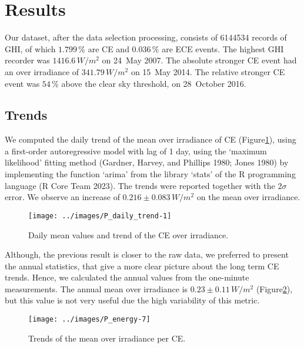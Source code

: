 \documentclass[
]{article}
\begin{document}
\FloatBarrier

\hypertarget{results}{%
\section{Results}\label{results}}

Our dataset, after the data selection processing, consists of
6144534 records of GHI, of which
\(1.799\,\%\) are CE and
\(0.036\,\%\) are ECE events.
The highest GHI recorder was
\(1416.6\,W/m^2\)
on 24~May 2007.
The absolute stronger CE event had an over irradiance of
\(341.79\,W/m^2\) on
15~May 2014.
The relative stronger CE event was
\(54\,\%\) above the
clear sky threshold, on
28~October 2016.

\hypertarget{trends}{%
\subsection{Trends}\label{trends}}

We computed the daily trend of the mean over irradiance of CE
(Figure\nobreakspace{}\ref{fig:CEmeanDaily}), using a first-order autoregressive
model with lag of 1 day, using the `maximum likelihood' fitting method (Gardner, Harvey, and Phillips 1980; Jones 1980) by implementing the function `arima' from the library `stats' of the R
programming language (R Core Team 2023). The trends were reported together with the \(2\sigma\)
error. We observe an increase of
\(0.216\pm 0.083\,W/m^2\)
on the mean over irradiance.

\begin{figure}[h!]

{\centering \texttt{[image: ../images/P\_daily\_trend-1]} 

}

\caption{Daily mean values and trend of the CE over irradiance.}\label{fig:CEmeanDaily}
\end{figure}

Although, the previous result is closer to the raw data, we preferred to present the
annual statistics, that give a more clear picture about the long term CE trends.
Hence, we calculated the annual values from the one-minute measurements.
The annual mean over irradiance is
\(0.23\pm 0.11\,W/m^2\)
(Figure\nobreakspace{}\ref{fig:P-energy-mean}),
but this value is not very useful due the high
variability of this metric.

\begin{figure}[h!]

{\centering \texttt{[image: ../images/P\_energy-7]} 

}

\caption{Trends of the mean over irradiance per CE.}\label{fig:P-energy-mean}
\end{figure}
\end{document}
